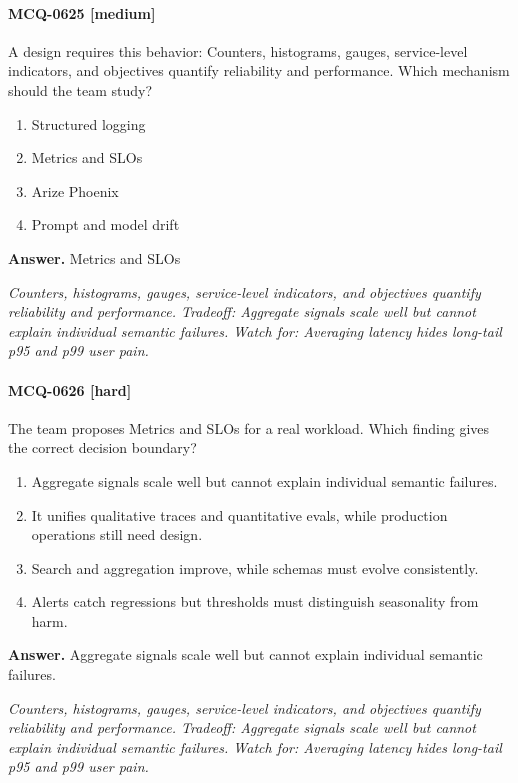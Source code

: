 \paragraph{MCQ-0625 [medium]} A design requires this behavior: Counters, histograms, gauges, service-level indicators, and objectives quantify reliability and performance. Which mechanism should the team study?
\begin{enumerate}[label=\Alph*.]
\item Structured logging
\item Metrics and SLOs
\item Arize Phoenix
\item Prompt and model drift
\end{enumerate}
\noindent\textbf{Answer.} Metrics and SLOs
\par\textit{Counters, histograms, gauges, service-level indicators, and objectives quantify reliability and performance. Tradeoff: Aggregate signals scale well but cannot explain individual semantic failures. Watch for: Averaging latency hides long-tail p95 and p99 user pain.}
\paragraph{MCQ-0626 [hard]} The team proposes Metrics and SLOs for a real workload. Which finding gives the correct decision boundary?
\begin{enumerate}[label=\Alph*.]
\item Aggregate signals scale well but cannot explain individual semantic failures.
\item It unifies qualitative traces and quantitative evals, while production operations still need design.
\item Search and aggregation improve, while schemas must evolve consistently.
\item Alerts catch regressions but thresholds must distinguish seasonality from harm.
\end{enumerate}
\noindent\textbf{Answer.} Aggregate signals scale well but cannot explain individual semantic failures.
\par\textit{Counters, histograms, gauges, service-level indicators, and objectives quantify reliability and performance. Tradeoff: Aggregate signals scale well but cannot explain individual semantic failures. Watch for: Averaging latency hides long-tail p95 and p99 user pain.}
